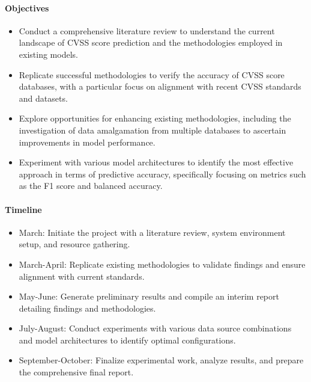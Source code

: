 \documentclass[12pt]{article}
\begin{document}
\paragraph{Objectives}
\begin{itemize}[noitemsep]
	\item Conduct a comprehensive literature review to understand the current landscape of CVSS score prediction and the methodologies employed in existing models.
	\item Replicate successful methodologies to verify the accuracy of CVSS score databases, with a particular focus on alignment with recent CVSS standards and datasets.
	\item Explore opportunities for enhancing existing methodologies, including the investigation of data amalgamation from multiple databases to ascertain improvements in model performance.
	\item Experiment with various model architectures to identify the most effective approach in terms of predictive accuracy, specifically focusing on metrics such as the F1 score and balanced accuracy.
\end{itemize}

\paragraph{Timeline}
\begin{itemize}[noitemsep]
	\item March: Initiate the project with a literature review, system environment setup, and resource gathering.
	\item March-April: Replicate existing methodologies to validate findings and ensure alignment with current standards.
	\item May-June: Generate preliminary results and compile an interim report detailing findings and methodologies.
	\item July-August: Conduct experiments with various data source combinations and model architectures to identify optimal configurations.
	\item September-October: Finalize experimental work, analyze results, and prepare the comprehensive final report.
\end{itemize}


\end{document}
